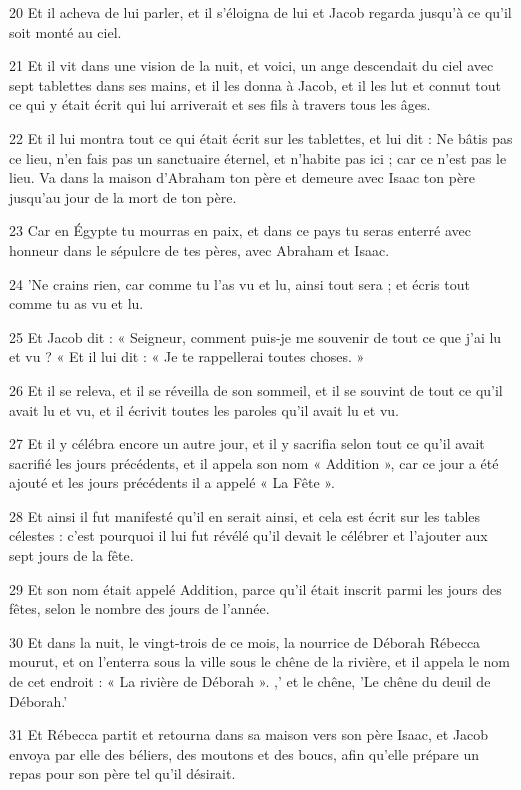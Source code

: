 \par 20 Et il acheva de lui parler, et il s'éloigna de lui et Jacob regarda jusqu'à ce qu'il soit monté au ciel.
\par 21 Et il vit dans une vision de la nuit, et voici, un ange descendait du ciel avec sept tablettes dans ses mains, et il les donna à Jacob, et il les lut et connut tout ce qui y était écrit qui lui arriverait et ses fils à travers tous les âges.
\par 22 Et il lui montra tout ce qui était écrit sur les tablettes, et lui dit : Ne bâtis pas ce lieu, n'en fais pas un sanctuaire éternel, et n'habite pas ici ; car ce n'est pas le lieu. Va dans la maison d'Abraham ton père et demeure avec Isaac ton père jusqu'au jour de la mort de ton père.
\par 23 Car en Égypte tu mourras en paix, et dans ce pays tu seras enterré avec honneur dans le sépulcre de tes pères, avec Abraham et Isaac.
\par 24 'Ne crains rien, car comme tu l'as vu et lu, ainsi tout sera ; et écris tout comme tu as vu et lu.
\par 25 Et Jacob dit : « Seigneur, comment puis-je me souvenir de tout ce que j'ai lu et vu ? « Et il lui dit : « Je te rappellerai toutes choses. »
\par 26 Et il se releva, et il se réveilla de son sommeil, et il se souvint de tout ce qu'il avait lu et vu, et il écrivit toutes les paroles qu'il avait lu et vu.
\par 27 Et il y célébra encore un autre jour, et il y sacrifia selon tout ce qu'il avait sacrifié les jours précédents, et il appela son nom « Addition », car ce jour a été ajouté et les jours précédents il a appelé « La Fête ».
\par 28 Et ainsi il fut manifesté qu'il en serait ainsi, et cela est écrit sur les tables célestes : c'est pourquoi il lui fut révélé qu'il devait le célébrer et l'ajouter aux sept jours de la fête.
\par 29 Et son nom était appelé Addition, parce qu'il était inscrit parmi les jours des fêtes, selon le nombre des jours de l'année.
\par 30 Et dans la nuit, le vingt-trois de ce mois, la nourrice de Déborah Rébecca mourut, et on l'enterra sous la ville sous le chêne de la rivière, et il appela le nom de cet endroit : « La rivière de Déborah ». ,' et le chêne, 'Le chêne du deuil de Déborah.'
\par 31 Et Rébecca partit et retourna dans sa maison vers son père Isaac, et Jacob envoya par elle des béliers, des moutons et des boucs, afin qu'elle prépare un repas pour son père tel qu'il désirait.
